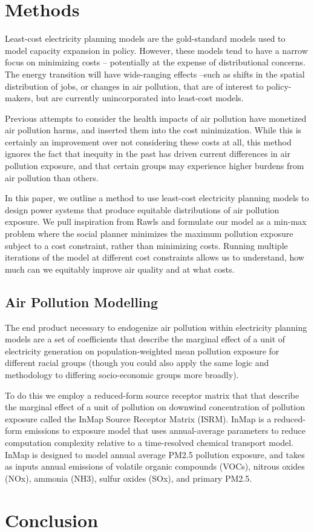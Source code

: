 \documentclass[a4paper]{article}
\theoremstyle{definition}
\theoremstyle{plain}
\begin{document}
\section{Methods}

Least-cost electricity planning models are the gold-standard models used to model capacity expansion in policy.  However, these models tend to have a narrow focus on minimizing costs -- potentially at the expense of distributional concerns.  The energy transition will have wide-ranging effects --such as shifts in the spatial distribution of jobs, or changes in air pollution, that are of interest to policy-makers, but are currently unincorporated into least-cost models.

Previous attempts to consider the health impacts of air pollution have monetized air pollution harms, and inserted them into the cost minimization.  While this is certainly an improvement over not considering these costs at all, this method ignores the fact that inequity in the past has driven current differences in air pollution exposure, and that certain groups may experience higher burdens from air pollution than others.

In this paper, we outline a method to use least-cost electricity planning models to design power systems that produce equitable distributions of air pollution exposure.  We pull inspiration from Rawls and formulate our model as a min-max problem where the social planner minimizes the maximum pollution exposure subject to a cost constraint, rather than minimizing costs.  Running multiple iterations of the model at different cost constraints allows us to understand, how much can we equitably improve air quality and at what costs.

\subsection{Air Pollution Modelling}
The end product necessary to endogenize air pollution within electricity planning models are a set of coefficients that describe the marginal effect of a unit of electricity generation on population-weighted mean pollution exposure for different racial groups (though you could also apply the same logic and methodology to differing socio-economic groups more broadly).  

To do this we employ a reduced-form source receptor matrix that that describe the marginal effect of a unit of pollution on downwind concentration of pollution exposure called the InMap Source Receptor Matrix (ISRM).  InMap is a reduced-form emissions to exposure model that uses annual-average parameters to reduce computation complexity relative to a time-resolved chemical transport model. InMap is designed to model annual average PM2.5 pollution exposure, and takes as inputs annual emissions of volatile organic compounds (VOCs), nitrous oxides (NOx), ammonia (NH3), sulfur oxides (SOx), and primary PM2.5.

\section{Conclusion}


\begin{singlespace}
\newpage

%

\end{singlespace}
\end{document}
